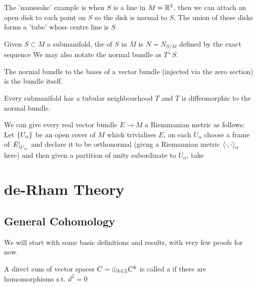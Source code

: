 \documentclass{article}
\begin{document}
\begin{example}
	The 'namesake' example is when $S$ is a line in $M=\mathbb{R}^3$, then we can attach an open disk to each point on $S$ so the disk is normal to $S$. The union of these disks forms a 'tube' whose centre line is $S$. 
\end{example}

\begin{definition}
Given $S \subset M$ a submanifold, the  of $S$ in $M$ is $N = N_{S/M}$ defined by the exact sequence 
We may also notate the normal bundle as $T^\perp S$.
\end{definition}

\begin{example}
	The normal bundle to the bases of a vector bundle (injected via the zero section) is the bundle itself.
\end{example}

\begin{theorem}
	Every submanifold has a tubular neighbourhood $T$ and $T$ is diffeomorphic to the normal bundle. 
\end{theorem}

We can give every real vector bundle $E \to M$ a Riemmanian metric as follows: Let $\left\{ U_\alpha \right\}$ be an open cover of $M$ which trivialises $E$, on each $U_\alpha$ choose a frame of $\left. E \right\rvert_{U_\alpha}$ and declare it to be orthonormal (givng a Riemannian metric $\left\langle \cdot,\cdot \right\rangle_\alpha$ here) and then given a partition of unity subordinate to $U_\alpha$, take 
\eq{
\pangle{\cdot,\cdot} = \sum_\alpha \pangle{\cdot,\cdot}_\alpha
}

\section{de-Rham Theory}
\subsection{General Cohomology}
We will start with some basic definitions and results, with very few proofs for now. 

\begin{definition}
	A direct sum of vector spaces $C = \oplus_{k \in \mathbb{Z}} C^k$ is called a  if there are homomorphisms
	s.t. $d^2=0$
\end{definition}
\end{document}
